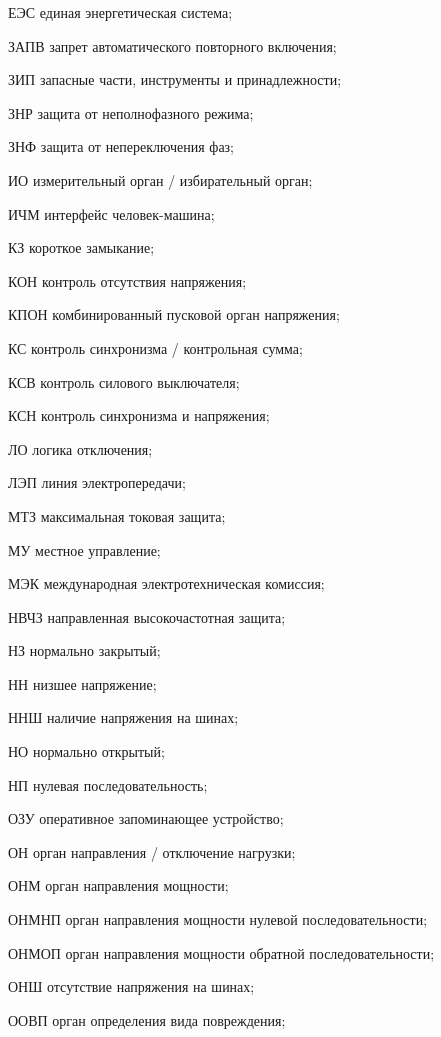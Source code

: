 \begin{list}{}
\item[ЕЭС] единая энергетическая система;
\item[ЗАПВ] запрет автоматического повторного включения;
\item[ЗИП] запасные части, инструменты и принадлежности;
\item[ЗНР] защита от неполнофазного режима;
\item[ЗНФ] защита от непереключения фаз;
\item[ИО] измерительный орган / избирательный орган;
\item[ИЧМ] интерфейс человек-машина;
\item[КЗ] короткое замыкание;
\item[КОН] контроль отсутствия напряжения;
\item[КПОН] комбинированный пусковой орган напряжения;
\item[КС] контроль синхронизма / контрольная сумма;
\item[КСВ] контроль силового выключателя;
\item[КСН] контроль синхронизма и напряжения;
\item[ЛО] логика отключения;
\item[ЛЭП] линия электропередачи;
\item[МТЗ] максимальная токовая защита;
\item[МУ] местное управление;
\item[МЭК] международная электротехническая комиссия;
\item[НВЧЗ] направленная высокочастотная защита;
\item[НЗ] нормально закрытый;
\item[НН] низшее напряжение;
\item[ННШ] наличие напряжения на шинах;
\item[НО] нормально открытый;
\item[НП] нулевая последовательность;
\item[ОЗУ] оперативное запоминающее устройство;
\item[ОН] орган направления / отключение нагрузки;
\item[ОНМ] орган направления мощности;
\item[ОНМНП] орган направления мощности нулевой последовательности;
\item[ОНМОП] орган направления мощности обратной последовательности;
\item[ОНШ] отсутствие напряжения на шинах;
\item[ООВП] орган определения вида повреждения;

\end{list}
